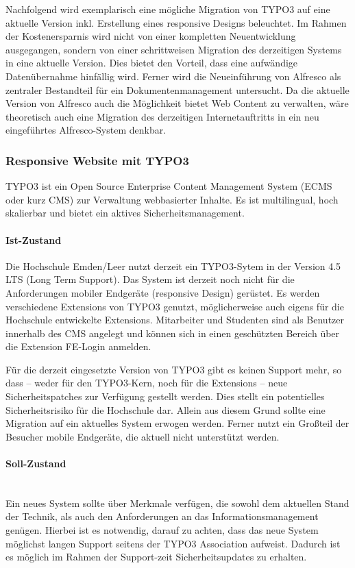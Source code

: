 Nachfolgend wird exemplarisch eine mögliche Migration von TYPO3 auf eine aktuelle Version inkl. Erstellung eines responsive Designs beleuchtet. Im Rahmen der Kostenersparnis wird nicht von einer kompletten Neuentwicklung ausgegangen, sondern von einer schrittweisen Migration des derzeitigen Systems in eine aktuelle Version. Dies bietet den Vorteil, dass eine aufwändige Datenübernahme hinfällig wird. Ferner wird die Neueinführung von Alfresco als zentraler Bestandteil für ein Dokumentenmanagement untersucht. Da die aktuelle Version von Alfresco auch die Möglichkeit bietet Web Content zu verwalten, wäre theoretisch auch eine Migration des derzeitigen Internetauftritts in ein neu eingeführtes Alfresco-System denkbar.

\subsubsection{Responsive Website mit TYPO3}
TYPO3\cite{typo3_overview_2015} ist ein Open Source Enterprise Content Management System (ECMS oder kurz CMS) zur Verwaltung webbasierter Inhalte. Es ist multilingual, hoch skalierbar und bietet ein aktives Sicherheitsmanagement.

\paragraph{Ist-Zustand}
Die Hochschule Emden/Leer nutzt derzeit ein TYPO3-Sytem in der Version 4.5 LTS (Long Term Support). Das System ist derzeit noch nicht für die Anforderungen mobiler Endgeräte (responsive Design) gerüstet. Es werden verschiedene Extensions von TYPO3 genutzt, möglicherweise auch eigens für die Hochschule entwickelte Extensions. Mitarbeiter und Studenten sind als Benutzer innerhalb des CMS angelegt und können sich in einen geschützten Bereich über die Extension FE-Login anmelden.

Für die derzeit eingesetzte Version von TYPO3 gibt es keinen Support mehr, so dass – weder für den TYPO3-Kern, noch für die Extensions – neue Sicherheitspatches zur Verfügung gestellt werden. Dies stellt ein potentielles Sicherheitsrisiko für die Hochschule dar. Allein aus diesem Grund sollte eine Migration auf ein aktuelles System erwogen werden. Ferner nutzt ein Großteil der Besucher mobile Endgeräte, die aktuell nicht unterstützt werden.

\paragraph{Soll-Zustand}\mbox{}\\
Ein neues System sollte über Merkmale verfügen, die sowohl dem aktuellen Stand der Technik, als auch den Anforderungen an das Informationsmanagement genügen. Hierbei ist es notwendig, darauf zu achten, dass das neue System möglichst langen Support seitens der TYPO3 Association aufweist. Dadurch ist es möglich im Rahmen der Support-zeit Sicherheitsupdates zu erhalten. 

